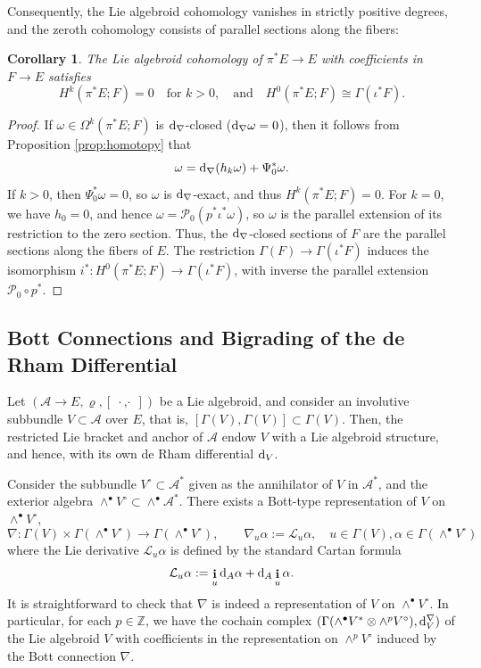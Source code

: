 \documentclass[12pt,letterpaper]{article}
\newcommand{\Z}{\mathbb{Z}}
\newcommand{\A}{\mathscr{A}}
\let\oldd\d
\renewcommand{\d}{%
  \relax\ifmmode\mathrm{d}\else\oldd\fi
}
\DeclareMathOperator{\ii}{\mathbf{i}}
\DeclareMathOperator{\dcd}{\,\cdot\,,\cdot\,}
\newtheorem{corollary}[theorem]{Corollary}
\numberwithin{equation}{section}
\begin{document}
Consequently, the Lie algebroid cohomology vanishes in strictly positive degrees, 
and the zeroth cohomology consists of parallel sections along the fibers:

\begin{corollary}\label{cor:vanish_piE}
The Lie algebroid cohomology of $\pi^*E\to E$ with coefficients in $F\to E$ satisfies
\begin{equation*}
    H^k(\pi^*E; F) = 0 \quad \text{for } k > 0, \quad \text{and} \quad H^0(\pi^*E; F) \cong \Gamma(\iota^*F).
\end{equation*}
\end{corollary}

\begin{proof}
If $\omega \in \Omega^k(\pi^*E; F)$ is $\d_\nabla$-closed ($\d_\nabla \omega = 0$), then
it follows from Proposition \ref{prop:homotopy} that
\begin{equation*}
    \omega = \d_\nabla (h_k \omega) + \Psi_0^* \omega.
\end{equation*}
If $k > 0$, then $\Psi_0^* \omega = 0$, so $\omega$ is $\d_\nabla$-exact, and thus $H^k(\pi^*E; F) = 0$.
For $k=0$, we have $h_0=0$, and hence $\omega=\mathcal{P}_0(p^*\iota^*\omega)$, so
$\omega$ is the parallel extension of its restriction to the zero section.
Thus, the $\d_\nabla$-closed sections of $F$ are the parallel sections along the fibers of $E$.
The restriction $\Gamma(F) \to \Gamma(\iota^*F)$ induces the isomorphism $i^*: H^0(\pi^*E; F) \to \Gamma(\iota^*F)$, with inverse the parallel extension $\mathcal{P}_0\circ p^*$.
\end{proof}


\subsection{Bott Connections and Bigrading of the de Rham Differential}

Let $(\A\to E,\varrho,[\dcd])$ be a Lie algebroid, and consider an involutive subbundle $V\subset\A$ over $E$, that is, $[\Gamma(V),\Gamma(V)]\subset\Gamma(V)$.
Then, the restricted Lie bracket and anchor of $\A$ endow $V$ with a Lie algebroid structure, 
and hence, with its own de Rham differential $\d_V$.

Consider the subbundle $V^\circ\subset\A^*$ given as the annihilator of $V$ in $\A^*$, 
and the exterior algebra $\wedge^{\bullet}V^\circ\subset\wedge^{\bullet}\A^*$.
There exists a Bott-type representation of $V$ on $\wedge^{\bullet}V^\circ$, 
\[  \nabla:\Gamma(V)\times\Gamma(\wedge^{\bullet}V^\circ)\to\Gamma(\wedge^{\bullet}V^\circ), \qquad \nabla_u\alpha := \mathcal{L}_u\alpha,  \quad u\in\Gamma(V), \alpha\in\Gamma(\wedge^{\bullet}V^\circ)\] 
where the Lie derivative $\mathcal{L}_u\alpha$ is defined by the standard Cartan formula
\[  \mathcal{L}_u\alpha := \ii_u\d_A\alpha + \d_A\ii_u\alpha. \]
It is straightforward to check that $\nabla$ is indeed a representation of $V$ on $\wedge^{\bullet}V^\circ$.
In particular, for each $p\in\Z$, we have the cochain complex $(\Gamma(\wedge^\bullet V^*\otimes\wedge^{p}V^\circ),\d^{\nabla}_V)$
of the Lie algebroid $V$ with coefficients in the representation on $\wedge^{p}V^\circ$ induced by the Bott connection $\nabla$.
\end{document}
